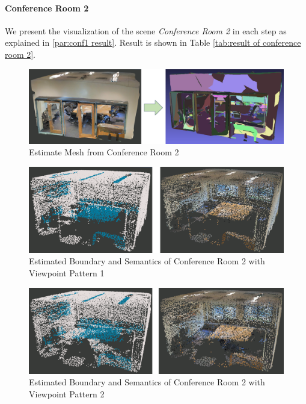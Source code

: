 \documentclass[11pt, a4paper,oneside,chapterprefix=false]{scrbook}
\begin{document}
\paragraph{Conference Room 2}

We present the visualization of the scene \textit{Conference Room 2} in each step as explained in \ref{par:conf1 result}. Result is shown in Table \ref{tab:result of conference room 2}.

\begin{figure}[H]
    \centering
    \includegraphics*[width=1.0\textwidth]{figures/estimate conf2.png}
    \caption{Estimate Mesh from Conference Room 2}
    \label{fig:estimate mesh from conference room 2}
\end{figure}

\begin{figure}[H]
    \centering
    \includegraphics*[width=1.0\textwidth]{figures/conf2 0.png}
    \caption{Estimated Boundary and Semantics of Conference Room 2 with Viewpoint Pattern 1}
    \label{fig:conf2 0}
\end{figure}

\begin{figure}[H]
    \centering
    \includegraphics*[width=1.0\textwidth]{figures/conf2 4.png}
    \caption{Estimated Boundary and Semantics of Conference Room 2 with Viewpoint Pattern 2}
    \label{fig:conf2 4}
\end{figure}
\end{document}
